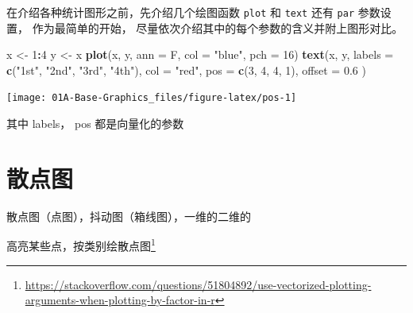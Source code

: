 \documentclass[a4paper,oneside,UTF8]{book}
\newenvironment{Shaded}{\begin{snugshade}}{\end{snugshade}}
\newcommand{\DataTypeTok}[1]{\textcolor[rgb]{0.13,0.29,0.53}{#1}}
\newcommand{\DecValTok}[1]{\textcolor[rgb]{0.00,0.00,0.81}{#1}}
\newcommand{\FloatTok}[1]{\textcolor[rgb]{0.00,0.00,0.81}{#1}}
\newcommand{\KeywordTok}[1]{\textcolor[rgb]{0.13,0.29,0.53}{\textbf{#1}}}
\newcommand{\NormalTok}[1]{#1}
\newcommand{\OperatorTok}[1]{\textcolor[rgb]{0.81,0.36,0.00}{\textbf{#1}}}
\newcommand{\OtherTok}[1]{\textcolor[rgb]{0.56,0.35,0.01}{#1}}
\newcommand{\StringTok}[1]{\textcolor[rgb]{0.31,0.60,0.02}{#1}}
\begin{document}
在介绍各种统计图形之前，先介绍几个绘图函数 \texttt{plot} 和 \texttt{text} 还有 \texttt{par} 参数设置， 作为最简单的开始， 尽量依次介绍其中的每个参数的含义并附上图形对比。

\begin{Shaded}
\begin{Highlighting}[]
\NormalTok{x <-}\StringTok{ }\DecValTok{1}\OperatorTok{:}\DecValTok{4}
\NormalTok{y <-}\StringTok{ }\NormalTok{x}
\KeywordTok{plot}\NormalTok{(x, y, }\DataTypeTok{ann =}\NormalTok{ F, }\DataTypeTok{col =} \StringTok{"blue"}\NormalTok{, }\DataTypeTok{pch =} \DecValTok{16}\NormalTok{)}
\KeywordTok{text}\NormalTok{(x, y,}
  \DataTypeTok{labels =} \KeywordTok{c}\NormalTok{(}\StringTok{"1st"}\NormalTok{, }\StringTok{"2nd"}\NormalTok{, }\StringTok{"3rd"}\NormalTok{, }\StringTok{"4th"}\NormalTok{),}
  \DataTypeTok{col =} \StringTok{"red"}\NormalTok{, }\DataTypeTok{pos =} \KeywordTok{c}\NormalTok{(}\DecValTok{3}\NormalTok{, }\DecValTok{4}\NormalTok{, }\DecValTok{4}\NormalTok{, }\DecValTok{1}\NormalTok{), }\DataTypeTok{offset =} \FloatTok{0.6}
\NormalTok{)}
\end{Highlighting}
\end{Shaded}

\begin{center}\texttt{[image: 01A-Base-Graphics\_files/figure-latex/pos-1]} \end{center}

其中 labels， pos 都是向量化的参数

\hypertarget{scatter-chart}{%
\section{散点图}\label{scatter-chart}}

散点图（点图），抖动图（箱线图），一维的二维的

高亮某些点，按类别绘散点图\footnote{\url{https://stackoverflow.com/questions/51804892/use-vectorized-plotting-arguments-when-plotting-by-factor-in-r}}

\begin{Shaded}
\end{Shaded}
\end{document}
